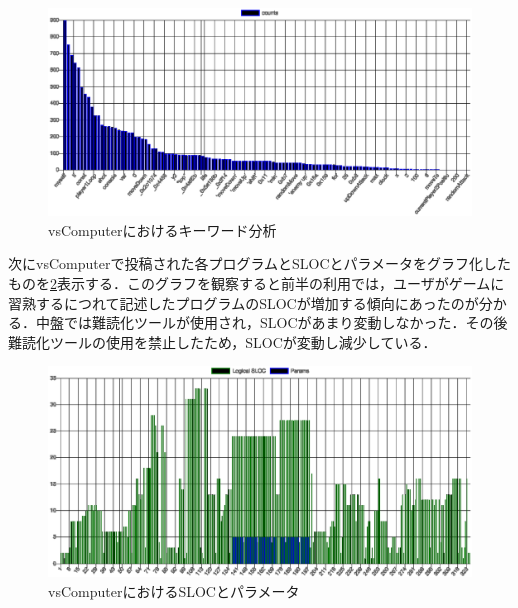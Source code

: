 \begin{enumerate}
  \begin{figure}[!h]
    \begin{center}
      \includegraphics[width=1.0\linewidth]{image/vsComputer_result.eps}
    \end{center}
      \vspace{-8mm} 
    \caption{vsComputerにおけるキーワード分析}
    \label{vsComputer_keyword}
  \end{figure}

次にvsComputerで投稿された各プログラムとSLOCとパラメータをグラフ化したものを\ref{vsComputer_sloc_and_params}表示する．このグラフを観察すると前半の利用では，ユーザがゲームに習熟するにつれて記述したプログラムのSLOCが増加する傾向にあったのが分かる．中盤では難読化ツールが使用され，SLOCがあまり変動しなかった．その後難読化ツールの使用を禁止したため，SLOCが変動し減少している．


\begin{figure}[!h]
  \begin{center}
    \includegraphics[width=1.0\linewidth]{image/sloc_and_params.eps}
  \end{center}
    \vspace{-8mm} 
  \caption{vsComputerにおけるSLOCとパラメータ}
  \label{vsComputer_sloc_and_params}
\end{figure}


\end{enumerate}
